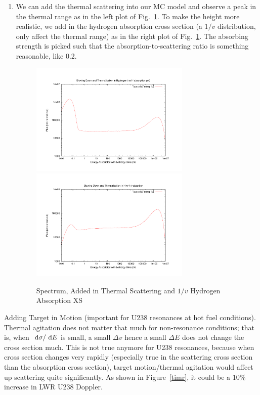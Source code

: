 \documentclass{school-22.211-notes}
\begin{document}
\begin{enumerate}
\begin{enumerate}
\item We can add the thermal scattering into our MC model and observe a peak in the thermal range as in the left plot of Fig.~\ref{spe2}. To make the height more realistic, we add in the hydrogen absorption cross section (a $1/v$ distribution, only affect the thermal range) as in the right plot of Fig.~\ref{spe2}. The absorbing strength is picked such that the absorption-to-scattering ratio is something reasonable, like 0.2. 
\begin{figure}[ht]
  \centering
  \includegraphics[width=3in]{images/sl-d/spec-4.uncrop.pdf}
  \includegraphics[width=3in]{images/sl-d/spec-5.uncrop.pdf}
  \caption{Spectrum, Added in Thermal Scattering and $1/v$ Hydrogen Absorption XS} \label{spe2}
\end{figure}
\end{enumerate}
\end{enumerate}
Adding Target in Motion (important for U238 resonances at hot fuel conditions). Thermal agitation does not matter that much for non-resonance conditions; that is, when $\mbox{ }\mathrm{d} \sigma/\mbox{ }\mathrm{d} E$ is small, a small $\Delta v$ hence a small $\Delta E$ does not change the cross section much. This is not true anymore for U238 resonances, because when cross section changes very rapidly (especially true in the scattering cross section than the absorption cross section), target motion/thermal agitation would affect up scattering quite significantly. As shown in Figure~\ref{timr}, it could be a 10\% increase in LWR U238 Doppler.  
\end{document}
